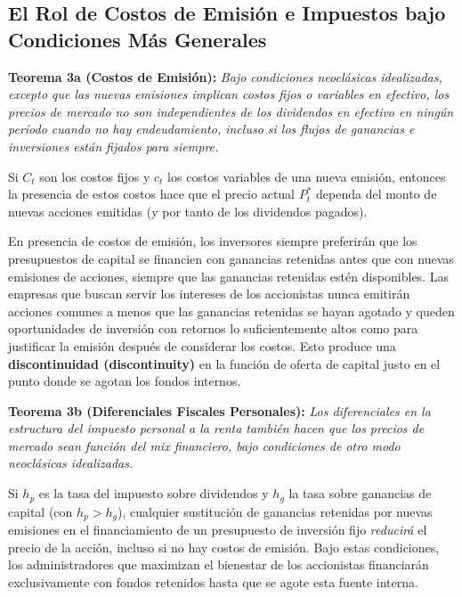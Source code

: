 \documentclass[12pt]{article}
\begin{document}
\subsection{El Rol de Costos de Emisi\'on e Impuestos bajo Condiciones M\'as Generales}

\textbf{Teorema 3a (Costos de Emisi\'on):} \textit{Bajo condiciones neocl\'asicas idealizadas, excepto que las nuevas emisiones implican costos fijos o variables en efectivo, los precios de mercado no son independientes de los dividendos en efectivo en ning\'un per\'iodo cuando no hay endeudamiento, incluso si los flujos de ganancias e inversiones est\'an fijados para siempre.}

Si $C_t$ son los costos fijos y $c_t$ los costos variables de una nueva emisi\'on, entonces la presencia de estos costos hace que el precio actual $P^*_t$ dependa del monto de nuevas acciones emitidas (y por tanto de los dividendos pagados).

\begin{explicacion}
En presencia de costos de emisi\'on, los inversores siempre preferir\'an que los presupuestos de capital se financien con ganancias retenidas antes que con nuevas emisiones de acciones, siempre que las ganancias retenidas est\'en disponibles. Las empresas que buscan servir los intereses de los accionistas nunca emitir\'an acciones comunes a menos que las ganancias retenidas se hayan agotado y queden oportunidades de inversi\'on con retornos lo suficientemente altos como para justificar la emisi\'on despu\'es de considerar los costos. Esto produce una \textbf{discontinuidad (discontinuity)} en la funci\'on de oferta de capital justo en el punto donde se agotan los fondos internos.
\end{explicacion}

\textbf{Teorema 3b (Diferenciales Fiscales Personales):} \textit{Los diferenciales en la estructura del impuesto personal a la renta tambi\'en hacen que los precios de mercado sean funci\'on del mix financiero, bajo condiciones de otro modo neocl\'asicas idealizadas.}

Si $h_p$ es la tasa del impuesto sobre dividendos y $h_g$ la tasa sobre ganancias de capital (con $h_p > h_g$), cualquier sustituci\'on de ganancias retenidas por nuevas emisiones en el financiamiento de un presupuesto de inversi\'on fijo \textit{reducir\'a} el precio de la acci\'on, incluso si no hay costos de emisi\'on. Bajo estas condiciones, los administradores que maximizan el bienestar de los accionistas financiar\'an exclusivamente con fondos retenidos hasta que se agote esta fuente interna.
\end{document}
